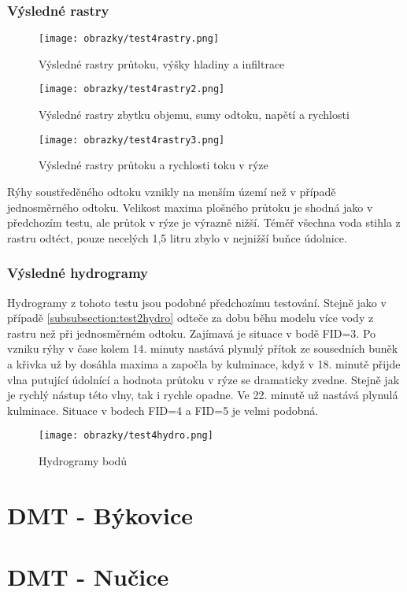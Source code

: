 \subsubsection{Výsledné rastry} \label{subsubsection:test4rastry}
\begin{figure}[hbt]
  \centering
  \texttt{[image: obrazky/test4rastry.png]}
  \caption{Výsledné rastry průtoku, výšky hladiny a infiltrace}
  \label{fig:test4rastry}
\end{figure}
\clearpage
\newpage
\begin{figure}[hbt]
  \centering
  \texttt{[image: obrazky/test4rastry2.png]}
  \caption{Výsledné rastry zbytku objemu, sumy odtoku, napětí a rychlosti}
  \label{fig:test4rastry2}
\end{figure}
\clearpage
\newpage
\begin{figure}[t]
  \centering
  \texttt{[image: obrazky/test4rastry3.png]}
  \caption{Výsledné rastry průtoku a rychlosti toku v rýze}
  \label{fig:test4rastry3}
\end{figure}
Rýhy soustředěného odtoku vznikly na menším území než v případě jednosměrného odtoku. Velikost maxima plošného průtoku je shodná jako v předchozím testu, ale průtok v rýze je výrazně nižší.
Téměř všechna voda stihla z rastru odtéct, pouze necelých 1,5 litru zbylo v nejnižší buňce údolnice.   
\clearpage
\subsubsection{Výsledné hydrogramy} \label{subsubsection:test3hydro}
Hydrogramy z tohoto testu jsou podobné předchozímu testování. Stejně jako v případě \ref{subsubsection:test2hydro} odteče za dobu běhu modelu více vody z rastru než při jednosměrném odtoku.
Zajímavá je situace v bodě FID=3. Po vzniku rýhy v čase kolem 14. minuty nastává plynulý přítok ze sousedních buněk a křivka už by dosáhla maxima a započla by kulminace, 
když v 18. minutě přijde vlna putující údolnící a hodnota průtoku v rýze se dramaticky zvedne. Stejně jak je rychlý nástup této vlny, tak i rychle opadne. Ve 22. minutě už nastává plynulá kulminace.
Situace v bodech FID=4 a FID=5 je velmi podobná.  
\begin{figure}[hbt]
  \centering
  \texttt{[image: obrazky/test4hydro.png]}
  \caption{Hydrogramy bodů}
  \label{fig:test4hydro}
\end{figure} 
\clearpage
\section{DMT - Býkovice} \label{section:testovacirastr}
\section{DMT - Nučice} \label{section:testovacirastr}
